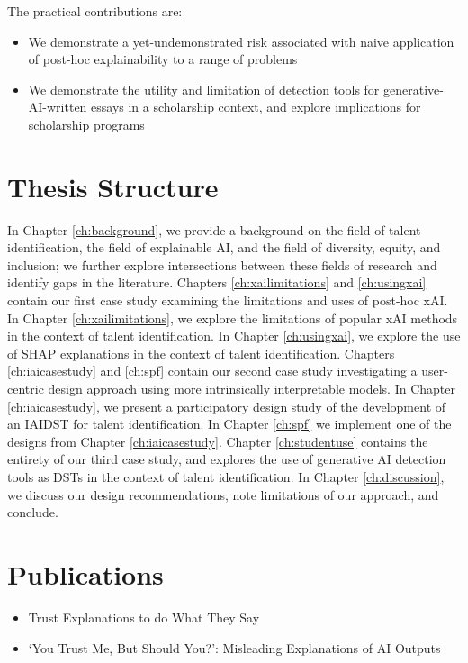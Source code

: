 The practical contributions are:

\begin{itemize}
    \item We demonstrate a yet-undemonstrated risk associated with naive application of post-hoc explainability to a range of problems
    \item We demonstrate the utility and limitation of detection tools for generative-AI-written essays in a scholarship context, and explore implications for scholarship programs
\end{itemize}

\section{Thesis Structure}
In Chapter \ref{ch:background}, we provide a background on the field of talent identification, the field of explainable AI, and the field of diversity, equity, and inclusion; we further explore intersections between these fields of research and identify gaps in the literature. Chapters \ref{ch:xailimitations} and \ref{ch:usingxai} contain our first case study examining the limitations and uses of post-hoc xAI. In Chapter \ref{ch:xailimitations}, we explore the limitations of popular xAI methods in the context of talent identification. In Chapter \ref{ch:usingxai}, we explore the use of SHAP explanations in the context of talent identification. Chapters \ref{ch:iaicasestudy} and \ref{ch:spf} contain our second case study investigating a user-centric design approach using more intrinsically interpretable models. In Chapter \ref{ch:iaicasestudy}, we present a participatory design study of the development of an IAIDST for talent identification. In Chapter \ref{ch:spf} we implement one of the designs from Chapter \ref{ch:iaicasestudy}. Chapter \ref{ch:studentuse} contains the entirety of our third case study, and explores the use of generative AI detection tools as DSTs in the context of talent identification. In Chapter \ref{ch:discussion}, we discuss our design recommendations, note limitations of our approach, and conclude.

\section{Publications}

\begin{itemize}
    \item \textcite{natarajan_trust_2023} Trust Explanations to do What They Say
    \item \textcite{...} `You Trust Me, But Should You?': Misleading Explanations of AI Outputs
\end{itemize}